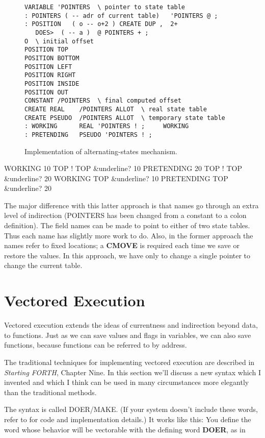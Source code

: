 \begin{figure*}
\caption{Implementation of alternating-states mechanism.}
\begin{center}
\begin{BVerbatim}
VARIABLE 'POINTERS  \ pointer to state table
: POINTERS ( -- adr of current table)   'POINTERS @ ;
: POSITION   ( o -- o+2 ) CREATE DUP ,  2+
   DOES>  ( -- a )  @ POINTERS + ;
O  \ initial offset
POSITION TOP
POSITION BOTTOM
POSITION LEFT
POSITION RIGHT
POSITION INSIDE
POSITION OUT
CONSTANT /POINTERS  \ final computed offset
CREATE REAL    /POINTERS ALLOT  \ real state table
CREATE PSEUDO  /POINTERS ALLOT  \ temporary state table
: WORKING      REAL 'POINTERS ! ;     WORKING
: PRETENDING   PSEUDO 'POINTERS ! ;
\end{BVerbatim}
\end{center}
\end{figure*}

\begin{Code}[commandchars=&\{\}]
WORKING
10 TOP !
TOP &underline{? 10}
PRETENDING
20 TOP !
TOP &underline{? 20}
WORKING
TOP &underline{? 10}
PRETENDING
TOP &underline{? 20}
\end{Code}
The major difference with this latter approach is that names go through
an extra level of indirection (POINTERS has been changed from a
constant to a colon definition). The field names can be made to point to
either of two state tables. Thus each name has slightly more work to do.
Also, in the former approach the names refer to fixed locations; a
\textbf{CMOVE} is required each time we save or restore the values. In this
approach, we have only to change a single pointer to change the current
table.

\section{Vectored Execution}

Vectored execution extends the ideas of currentness and indirection
beyond data, to functions. Just as we can save values and flags in
variables, we can also save functions, because functions can be referred to
by address.

The traditional techniques for implementing vectored execution are
described in \emph{Starting FORTH}, Chapter Nine. In this section we'll
discuss a new syntax which I invented and which I think can be used in many
circumstances more elegantly than the traditional methods.

The syntax is called DOER/MAKE. (If your system doesn't include
these words, refer to  for code and implementation details.) It
works like this: You define the word whose behavior will be vectorable
with the defining word \textbf{DOER}, as in

